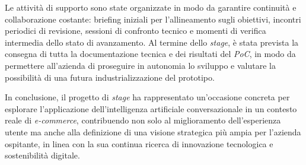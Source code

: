 Le attività di supporto sono state organizzate in modo da garantire continuità e collaborazione costante: briefing iniziali per l’allineamento sugli obiettivi, 
incontri periodici di revisione, sessioni di confronto tecnico e momenti di verifica intermedia dello stato di avanzamento. Al termine dello \emph{stage}, 
è stata prevista la consegna di tutta la documentazione tecnica e dei risultati del \emph{PoC}, in modo da permettere all’azienda di proseguire in autonomia lo sviluppo e 
valutare la possibilità di una futura industrializzazione del prototipo.

In conclusione, il progetto di \emph{stage} ha rappresentato un’occasione concreta per esplorare l’applicazione dell’intelligenza artificiale conversazionale 
in un contesto reale di \emph{e-commerce}, contribuendo non solo al miglioramento dell’esperienza utente ma anche alla definizione di una visione strategica 
più ampia per l’azienda ospitante, in linea con la sua continua ricerca di innovazione tecnologica e sostenibilità digitale.












